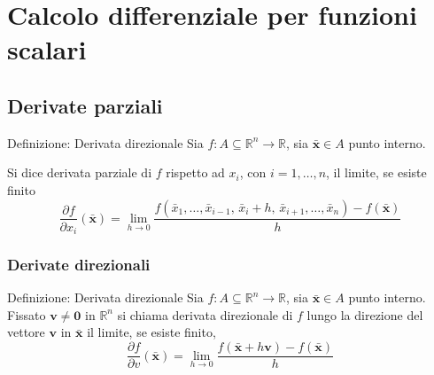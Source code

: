 \documentclass[x11names]{article}
\begin{document}
	
	
	
	
	
	
	\newpage
	\section{Calcolo differenziale per funzioni scalari}
	
	
	\subsection{Derivate parziali}
	\begin{center}
		\colorbox{myblue}{\begin{minipage}{5.75in}
				\begin{blues}{Definizione: Derivata direzionale}
					Sia \(f:A\subseteq \mathbb{R}^n \to \mathbb{R}\), sia \(\boldsymbol{\bar{x}} \in A\) punto interno.
					
					Si dice derivata parziale di \(f\) rispetto ad \(x_{i}\), con \(i=1,\dots,n\), il limite, se esiste finito
					\[ 
					\frac{\partial f}{\partial x_{i}}(\boldsymbol{\bar{x}}) = \lim_{h\to 0}\frac{f(\bar{x}_{1},\dots,\bar{x}_{i-1},\,\bar{x}_{i} + h,\, \bar{x}_{i+1}, \dots, \bar{x}_{n}) - f(\boldsymbol{\bar{x}})}{h}
					\]
				\end{blues}
		\end{minipage}}       
	\end{center}
	
	\subsubsection{Derivate direzionali}
	\begin{center}
		\colorbox{myblue}{\begin{minipage}{5.75in}
				\begin{blues}{Definizione: Derivata direzionale}
					Sia \(f:A\subseteq \mathbb{R}^n \to \mathbb{R}\), sia \(\boldsymbol{\bar{x}} \in A\) punto interno. Fissato \(\boldsymbol{v} \neq \boldsymbol{0}\) in \(\mathbb{R}^n\) si chiama derivata direzionale di \(f\) lungo la direzione del vettore \(\boldsymbol{v}\) in \(\boldsymbol{\bar{x}}\) il limite, se esiste finito,
					\[ 
					\frac{\partial f}{\partial v}(\boldsymbol{\bar{x}}) = \lim_{h\to 0} 
					\frac{f(\boldsymbol{\bar{x}} + h\boldsymbol{v}) - f(\boldsymbol{\bar{x}})}{h}
					\]
				\end{blues}
		\end{minipage}}       
	\end{center}
	
\end{document}
